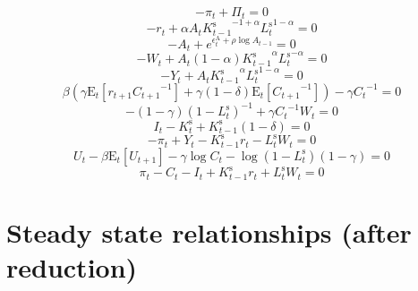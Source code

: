 \begin{equation}
-\pi_{t} + \Pi_{t} = 0
\end{equation}
\begin{equation}
-r_{t} + {\alpha} {A_{t}} {{K^{\mathrm{s}}_{t-1}}^{-1 + \alpha}} {{L^{\mathrm{s}}_{t}}^{1 - \alpha}} = 0
\end{equation}
\begin{equation}
-A_{t} + e^{\epsilon^{\mathrm{A}}_{t} + {\rho} {\log{A_{t-1}}}} = 0
\end{equation}
\begin{equation}
-W_{t} + {A_{t}} \left(1 - \alpha\right) {{K^{\mathrm{s}}_{t-1}}^{\alpha}} {{L^{\mathrm{s}}_{t}}^{-\alpha}} = 0
\end{equation}
\begin{equation}
-Y_{t} + {A_{t}} {{K^{\mathrm{s}}_{t-1}}^{\alpha}} {{L^{\mathrm{s}}_{t}}^{1 - \alpha}} = 0
\end{equation}
\begin{equation}
{\beta} \left({\gamma} {\mathrm{E}_{t}\left[{r_{t+1}} {C_{t+1}}^{-1}\right]} + {\gamma} \left(1 - \delta\right) {\mathrm{E}_{t}\left[{C_{t+1}}^{-1}\right]}\right) - {\gamma} {C_{t}}^{-1} = 0
\end{equation}
\begin{equation}
-\left(1 - \gamma\right) \left(1 - L^{\mathrm{s}}_{t}\right)^{-1} + {\gamma} {C_{t}}^{-1} {W_{t}} = 0
\end{equation}
\begin{equation}
I_{t} - K^{\mathrm{s}}_{t} + {K^{\mathrm{s}}_{t-1}} \left(1 - \delta\right) = 0
\end{equation}
\begin{equation}
-\pi_{t} + Y_{t} - {K^{\mathrm{s}}_{t-1}} {r_{t}} - {L^{\mathrm{s}}_{t}} {W_{t}} = 0
\end{equation}
\begin{equation}
U_{t} - {\beta} {\mathrm{E}_{t}\left[U_{t+1}\right]} - {\gamma} {\log{C_{t}}} - {\log\left(1 - L^{\mathrm{s}}_{t}\right)} \left(1 - \gamma\right) = 0
\end{equation}
\begin{equation}
\pi_{t} - C_{t} - I_{t} + {K^{\mathrm{s}}_{t-1}} {r_{t}} + {L^{\mathrm{s}}_{t}} {W_{t}} = 0
\end{equation}



\section{Steady state relationships (after reduction)}


